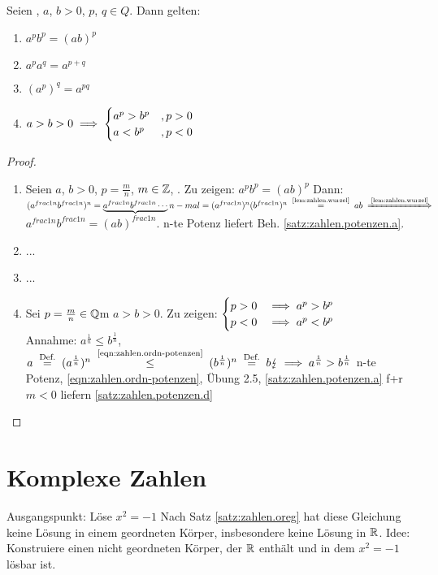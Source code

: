 \documentclass[12pt]{scrreprt}
\begin{document}
\begin{satz}\label{satz:zahlen.potenzen}
Seien , $a$, $b > 0$, $p$, $q \in {Q}$. Dann gelten:
\begin{enumerate}
\item \label{satz:zahlen.potenzen.a}
$a^p b^p = (ab)^p$
\item \label{satz:zahlen.potenzen.b}
$a^p a^q = a^{p+q}$
\item \label{satz:zahlen.potenzen.c}
$(a^p)^q = a^{pq}$
\item \label{satz:zahlen.potenzen.d}
$a>b>0 \implies \begin{cases}
a^p>b^p &, p>0\\
a<b^p &, p<0
\end{cases}$
\end{enumerate}
\end{satz}
\begin{proof}
\begin{enumerate}
\item Seien $a$, $b >0$, $p = \frac{m}{n}$, $m \in \mathbb{Z}$, .
Zu zeigen: $a^p b^p = (ab)^p$ Dann: $(a^{frac{1}{n}}b^{frac{1}{n}})^n =
\underbrace{a^{frac{1}{n}}b^{frac{1}{n}}\dotsm}{n-mal} =
(a^{frac{1}{n}})^n (b^{frac{1}{n}})^n \nach{=}{\ref{lem:zahlen.wurzel}} ab \folgtnach{\ref{lem:zahlen.wurzel}} $
$a^{frac{1}{n}}b^{frac{1}{n}} = (ab)^{frac{1}{n}}$. n-te Potenz liefert Beh. \ref{satz:zahlen.potenzen.a}.
\item ...
\item ...
\item Sei $p = \frac{m}{n} \in \mathbb{Q}$m $a>b>0$. Zu zeigen: 
$\begin{cases}
p>0 &\implies a^p > b^p\\
p<0 &\implies a^p < b^p
\end{cases}$\\
Annahme: $a^\frac{1}{n} \le b^\frac{1}{n}$, 
$a \nach{=}{Def.} (a^\frac{1}{n})^n \nach{\le}{\ref{eqn:zahlen.ordn-potenzen}} (b^\frac{1}{n})^n \nach{=}{Def.} b 
\blitz \folgt a^\frac{1}{n} > b^\frac{1}{n}$ n-te Potenz, \ref{eqn:zahlen.ordn-potenzen}, Übung 2.5, \ref{satz:zahlen.potenzen.a} f+r $m<0$ liefern \ref{satz:zahlen.potenzen.d}

\end{enumerate}
\end{proof}

\section{Komplexe Zahlen}
\label{sec:zahlen.komplex}
Ausgangspunkt: Löse $x^2 = -1$ Nach Satz \ref{satz:zahlen.oreg} hat diese Gleichung keine Lösung in einem geordneten Körper, insbesondere
keine Lösung in $\mathbb{R}$. Idee: Konstruiere einen nicht geordneten Körper, der $\mathbb{R}$ enthält und in dem $x^2 = -1$ lösbar ist. 
\end{document}
